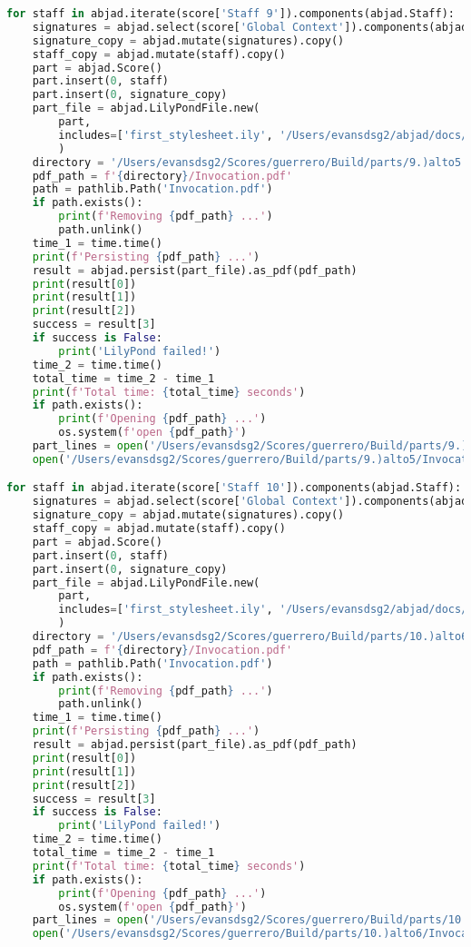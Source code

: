 \begin{lstlisting}[language=Python, caption=Invocation Source Code]
for staff in abjad.iterate(score['Staff 9']).components(abjad.Staff):
    signatures = abjad.select(score['Global Context']).components(abjad.Staff)
    signature_copy = abjad.mutate(signatures).copy()
    staff_copy = abjad.mutate(staff).copy()
    part = abjad.Score()
    part.insert(0, staff)
    part.insert(0, signature_copy)
    part_file = abjad.LilyPondFile.new(
        part,
        includes=['first_stylesheet.ily', '/Users/evansdsg2/abjad/docs/source/_stylesheets/abjad.ily'],
        )
    directory = '/Users/evansdsg2/Scores/guerrero/Build/parts/9.)alto5'
    pdf_path = f'{directory}/Invocation.pdf'
    path = pathlib.Path('Invocation.pdf')
    if path.exists():
        print(f'Removing {pdf_path} ...')
        path.unlink()
    time_1 = time.time()
    print(f'Persisting {pdf_path} ...')
    result = abjad.persist(part_file).as_pdf(pdf_path)
    print(result[0])
    print(result[1])
    print(result[2])
    success = result[3]
    if success is False:
        print('LilyPond failed!')
    time_2 = time.time()
    total_time = time_2 - time_1
    print(f'Total time: {total_time} seconds')
    if path.exists():
        print(f'Opening {pdf_path} ...')
        os.system(f'open {pdf_path}')
    part_lines = open('/Users/evansdsg2/Scores/guerrero/Build/parts/9.)alto5/Invocation.ly').readlines()
    open('/Users/evansdsg2/Scores/guerrero/Build/parts/9.)alto5/Invocation.ly', 'w').writelines(part_lines[15:-1])

for staff in abjad.iterate(score['Staff 10']).components(abjad.Staff):
    signatures = abjad.select(score['Global Context']).components(abjad.Staff)
    signature_copy = abjad.mutate(signatures).copy()
    staff_copy = abjad.mutate(staff).copy()
    part = abjad.Score()
    part.insert(0, staff)
    part.insert(0, signature_copy)
    part_file = abjad.LilyPondFile.new(
        part,
        includes=['first_stylesheet.ily', '/Users/evansdsg2/abjad/docs/source/_stylesheets/abjad.ily'],
        )
    directory = '/Users/evansdsg2/Scores/guerrero/Build/parts/10.)alto6'
    pdf_path = f'{directory}/Invocation.pdf'
    path = pathlib.Path('Invocation.pdf')
    if path.exists():
        print(f'Removing {pdf_path} ...')
        path.unlink()
    time_1 = time.time()
    print(f'Persisting {pdf_path} ...')
    result = abjad.persist(part_file).as_pdf(pdf_path)
    print(result[0])
    print(result[1])
    print(result[2])
    success = result[3]
    if success is False:
        print('LilyPond failed!')
    time_2 = time.time()
    total_time = time_2 - time_1
    print(f'Total time: {total_time} seconds')
    if path.exists():
        print(f'Opening {pdf_path} ...')
        os.system(f'open {pdf_path}')
    part_lines = open('/Users/evansdsg2/Scores/guerrero/Build/parts/10.)alto6/Invocation.ly').readlines()
    open('/Users/evansdsg2/Scores/guerrero/Build/parts/10.)alto6/Invocation.ly', 'w').writelines(part_lines[15:-1])


\end{lstlisting}
